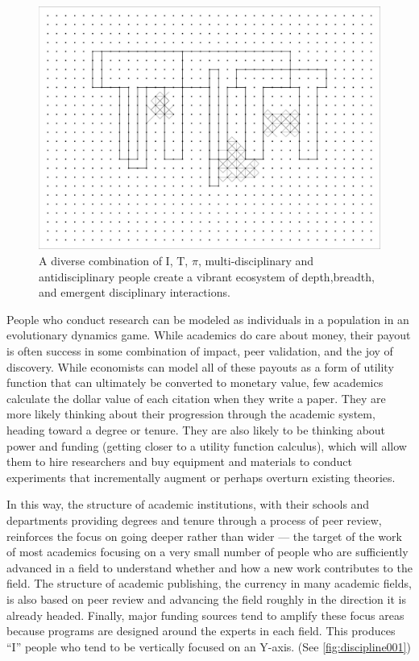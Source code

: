 \begin{figure}[h]
 \centering
 \includegraphics[width=1\textwidth]{pictures/JoiIllustr_V3-05.jpg}
 \caption{A diverse combination of I, T, $\pi$, multi-disciplinary and antidisciplinary people create a vibrant ecosystem of depth,breadth, and emergent disciplinary interactions.}
 \label{fig:discipline005}
\end{figure}

People who conduct research can be modeled as individuals in a population in an evolutionary dynamics game. While academics do care about money, their payout is often success in some combination of impact, peer validation, and the joy of discovery. While economists can model all of these payouts as a form of utility function that can ultimately be converted to monetary value, few academics calculate the dollar value of each citation when they write a paper. They are more likely thinking about their progression through the academic system, heading toward a degree or tenure. They are also likely to be thinking about power and funding (getting closer to a utility function calculus), which will allow them to hire researchers and buy equipment and materials to conduct experiments that incrementally augment or perhaps overturn existing theories.

In this way, the structure of academic institutions, with their schools and departments providing degrees and tenure through a process of peer review, reinforces the focus on going deeper rather than wider --- the target of the work of most academics focusing on a very small number of people who are sufficiently advanced in a field to understand whether and how a new work contributes to the field. The structure of academic publishing, the currency in many academic fields, is also based on peer review and advancing the field roughly in the direction it is already headed. Finally, major funding sources tend to amplify these focus areas because programs are designed around the experts in each field. This produces ``I'' people who tend to be vertically focused on an Y-axis. (See \autoref{fig:discipline001})

